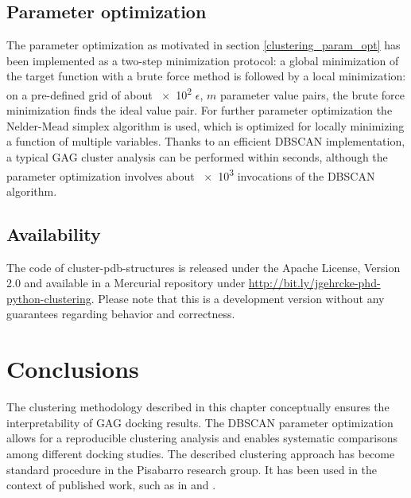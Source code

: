 \subsection{Parameter optimization}

The parameter optimization as motivated in section \ref{clustering_param_opt}
has been implemented as a two-step minimization protocol: a global minimization
of the target function with a brute force method is followed by a local
minimization: on a pre-defined grid of about \num{e2} $\epsilon$, $m$ parameter
value pairs, the brute force minimization finds the ideal value pair. For
further parameter optimization the Nelder-Mead simplex algorithm
\cite{nelder_mead} is used, which is optimized for locally minimizing a function
of multiple variables. Thanks to an efficient DBSCAN implementation, a typical
GAG cluster analysis can be performed within seconds, although the parameter
optimization involves about \num{e3} invocations of the DBSCAN algorithm.


\subsection{Availability}

The code of cluster-pdb-structures is released under the Apache License, Version
2.0 \cite{apache_license_2} and available in a Mercurial repository under
\url{http://bit.ly/jgehrcke-phd-python-clustering}. Please note that this is a
development version without any guarantees regarding behavior and correctness.


\section{Conclusions}

The clustering methodology described in this chapter conceptually ensures the
interpretability of GAG docking results. The DBSCAN parameter optimization
allows for a reproducible clustering analysis and enables systematic comparisons
among different docking studies. The described clustering approach has become
standard procedure in the Pisabarro research group. It has been used in the
context of published work, such as in \cite{franz_cathepsin_2013}
and \cite{dmd_samsonov_gehrcke_2014}.




